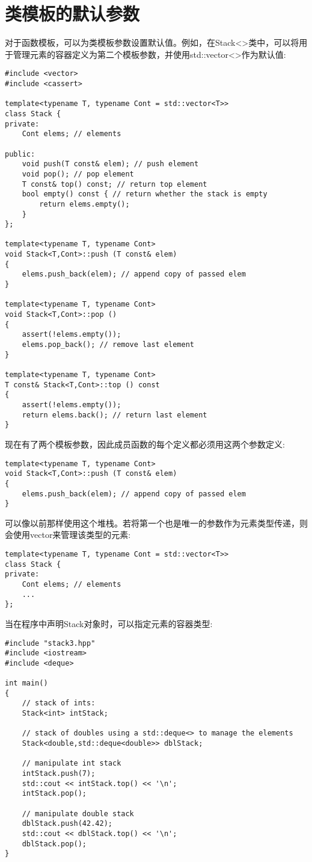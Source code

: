 \section{类模板的默认参数}

对于函数模板，可以为类模板参数设置默认值。例如，在Stack<>类中，可以将用于管理元素的容器定义为第二个模板参数，并使用std::vector<>作为默认值:

\begin{lstlisting}[style=styleCXX]
#include <vector>
#include <cassert>

template<typename T, typename Cont = std::vector<T>>
class Stack {
private:
	Cont elems; // elements
	
public:
	void push(T const& elem); // push element
	void pop(); // pop element
	T const& top() const; // return top element
	bool empty() const { // return whether the stack is empty
		return elems.empty();
	}
};

template<typename T, typename Cont>
void Stack<T,Cont>::push (T const& elem)
{
	elems.push_back(elem); // append copy of passed elem
}

template<typename T, typename Cont>
void Stack<T,Cont>::pop ()
{
	assert(!elems.empty());
	elems.pop_back(); // remove last element
}

template<typename T, typename Cont>
T const& Stack<T,Cont>::top () const
{
	assert(!elems.empty());
	return elems.back(); // return last element
}
\end{lstlisting}

现在有了两个模板参数，因此成员函数的每个定义都必须用这两个参数定义:

\begin{lstlisting}[style=styleCXX]
template<typename T, typename Cont>
void Stack<T,Cont>::push (T const& elem)
{
	elems.push_back(elem); // append copy of passed elem
}
\end{lstlisting}

可以像以前那样使用这个堆栈。若将第一个也是唯一的参数作为元素类型传递，则会使用vector来管理该类型的元素:

\begin{lstlisting}[style=styleCXX]
template<typename T, typename Cont = std::vector<T>>
class Stack {
private:
	Cont elems; // elements
	...
};
\end{lstlisting}

当在程序中声明Stack对象时，可以指定元素的容器类型:

\begin{lstlisting}[style=styleCXX]
#include "stack3.hpp"
#include <iostream>
#include <deque>

int main()
{
	// stack of ints:
	Stack<int> intStack;

	// stack of doubles using a std::deque<> to manage the elements
	Stack<double,std::deque<double>> dblStack;

	// manipulate int stack
	intStack.push(7);
	std::cout << intStack.top() << '\n';
	intStack.pop();

	// manipulate double stack
	dblStack.push(42.42);
	std::cout << dblStack.top() << '\n';
	dblStack.pop();
}
\end{lstlisting}

